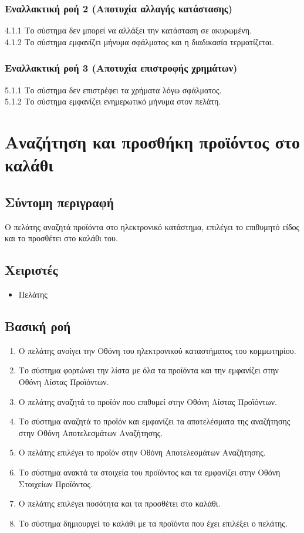 \documentclass[12pt,a4paper,twoside]{book}
\begin{document}
\subsubsection*{Εναλλακτική ροή 2 (Αποτυχία αλλαγής κατάστασης)}
4.1.1 Το σύστημα δεν μπορεί να αλλάξει την κατάσταση σε ακυρωμένη.\\
\hspace*{\parindent}4.1.2 Το σύστημα εμφανίζει μήνυμα σφάλματος και η διαδικασία τερματίζεται.

\subsubsection*{Εναλλακτική ροή 3 (Αποτυχία επιστροφής χρημάτων)}
5.1.1 Το σύστημα δεν επιστρέφει τα χρήματα λόγω σφάλματος.\\
\hspace*{\parindent}5.1.2 Το σύστημα εμφανίζει ενημερωτικό μήνυμα στον πελάτη.

\section{Αναζήτηση και προσθήκη προϊόντος στο καλάθι}

\subsection{Σύντομη περιγραφή}
Ο πελάτης αναζητά προϊόντα στο ηλεκτρονικό κατάστημα, επιλέγει το επιθυμητό είδος και το προσθέτει στο καλάθι του.

\subsection{Χειριστές}
\begin{itemize}
    \item Πελάτης
\end{itemize}

\subsection{Βασική ροή}
\begin{enumerate}
    \item Ο πελάτης ανοίγει την Οθόνη του ηλεκτρονικού καταστήματος του κομμωτηρίου.
    \item Το σύστημα φορτώνει την λίστα με όλα τα προϊόντα και την εμφανίζει στην Οθόνη Λίστας Προϊόντων.
    \item Ο πελάτης αναζητά το προϊόν που επιθυμεί στην Οθόνη Λίστας Προϊόντων.
    \item Το σύστημα αναζητά το προϊόν και εμφανίζει τα αποτελέσματα της αναζήτησης στην Οθόνη Αποτελεσμάτων Αναζήτησης.
    \item Ο πελάτης επιλέγει το προϊόν στην Οθόνη Αποτελεσμάτων Αναζήτησης.
    \item Το σύστημα ανακτά τα στοιχεία του προϊόντος και τα εμφανίζει στην Οθόνη Στοιχείων Προϊόντος.
    \item Ο πελάτης επιλέγει ποσότητα και τα προσθέτει στο καλάθι.
    \item Το σύστημα δημιουργεί το καλάθι με τα προϊόντα που έχει επιλέξει ο πελάτης.
\end{enumerate}
\end{document}
